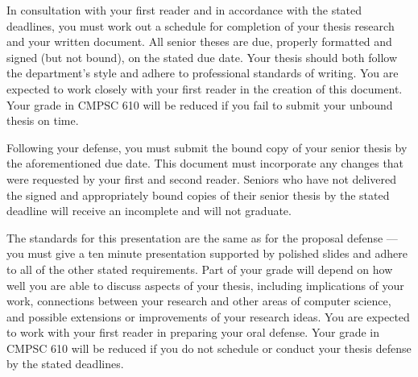 \medskip
{} In consultation with your first reader and in accordance with the stated deadlines, you
must work out a schedule for completion of your thesis research and your written document. All senior theses are due,
properly formatted and signed (but not bound), on the stated due date. 	Your thesis should both follow the department's
style and adhere to professional standards of writing. You are expected to work closely with your first reader in the
creation of this document.  Your grade in CMPSC 610 will be reduced if you fail to submit your unbound thesis on time.

Following your defense, you must submit the bound copy of your senior thesis by the aforementioned due date.  This
document must incorporate any changes that were requested by your first and second reader. Seniors who have not
delivered the signed and appropriately bound copies of their senior thesis by the stated deadline will receive an
incomplete and will not graduate.

\medskip 
{} The standards for this presentation are the same as for the proposal defense ---  you
must give a ten minute presentation supported by polished slides and adhere to all of the other stated requirements.
Part of your grade will depend on how well you are able to discuss aspects of your thesis, including implications of
your work, connections between your research and other areas of computer science, and possible extensions or
improvements of your research ideas.  You are expected to work with your first reader in preparing your oral defense.
Your grade in CMPSC 610 will be reduced if you do not schedule or conduct your thesis defense by the stated deadlines.

% 

